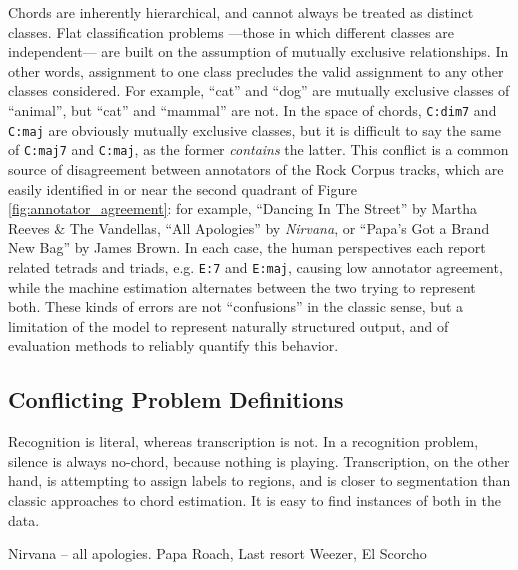 \documentclass{article}
\begin{document}
Chords are inherently hierarchical, and cannot always be treated as distinct classes.
Flat classification problems ---those in which different classes are independent--- are built on the assumption of mutually exclusive relationships.
In other words, assignment to one class precludes the valid assignment to any other classes considered.
For example, ``cat'' and ``dog'' are mutually exclusive classes of ``animal'', but ``cat'' and ``mammal'' are not.
In the space of chords, \texttt{C:dim7} and \texttt{C:maj} are obviously mutually exclusive classes, but it is difficult to say the same of \texttt{C:maj7} and \texttt{C:maj}, as the former \emph{contains} the latter.
This conflict is a common source of disagreement between annotators of the Rock Corpus tracks, which are easily identified in or near the second quadrant of Figure \ref{fig:annotator_agreement}:
for example, ``Dancing In The Street'' by Martha Reeves \& The Vandellas, ``All Apologies'' by \emph{Nirvana}, or ``Papa's Got a Brand New Bag'' by James Brown.
In each case, the human perspectives each report related tetrads and triads, e.g. \texttt{E:7} and \texttt{E:maj}, causing low annotator agreement, while the machine estimation alternates between the two trying to represent both.
These kinds of errors are not ``confusions'' in the classic sense, but a limitation of the model to represent naturally structured output, and of evaluation methods to reliably quantify this behavior.




\subsection{Conflicting Problem Definitions}

Recognition is literal, whereas transcription is not.
In a recognition problem, silence is always no-chord, because nothing is playing.
Transcription, on the other hand, is attempting to assign labels to regions, and is closer to segmentation than classic approaches to chord estimation.
It is easy to find instances of both in the data.


Nirvana -- all apologies.
Papa Roach, Last resort
Weezer, El Scorcho
\end{document}
